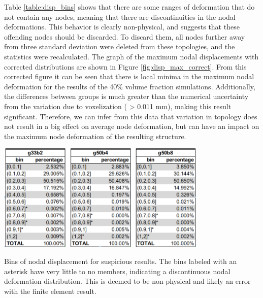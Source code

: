 \documentclass[../main.tex]{subfiles}
\begin{document}
Table \ref{table:disp_bins} shows that there are some ranges of deformation that do not contain any nodes, meaning that there are discontinuities in the nodal deformations. This behavior is clearly non-physical, and suggests that these offending nodes should be discarded. To discard them, all nodes further away from three standard deviation were deleted from these topologies, and the statistics were recalculated. The graph of the maximum nodal displacements with corrected distributions are shown in Figure \ref{fig:disp_max_correct}. From this corrected figure it can be seen that there is local minima in the maximum nodal deformation for the results of the 40\% volume fraction simulations. Additionally, the differences between groups is much greater than the numerical uncertainty from the variation due to voxelization ( > 0.011 mm), making this result significant. Therefore, we can infer from this data that variation in topology does not result in a big effect on average node deformation, but can have an impact on the maximum node deformation of the resulting structure.

\begin{table}[h!]
  \centering
  \includegraphics[width=0.75\textwidth]{images/results/plots/femoral/displacement/bins.png}
  \caption{Bins of nodal displacement for suspicious results. The bins labeled with an asterisk have very little to no members, indicating a discontinuous nodal deformation distribution. This is deemed to be non-physical and likely an error with the finite element result.}
  \label{table:disp_bins}
\end{table}
\end{document}
